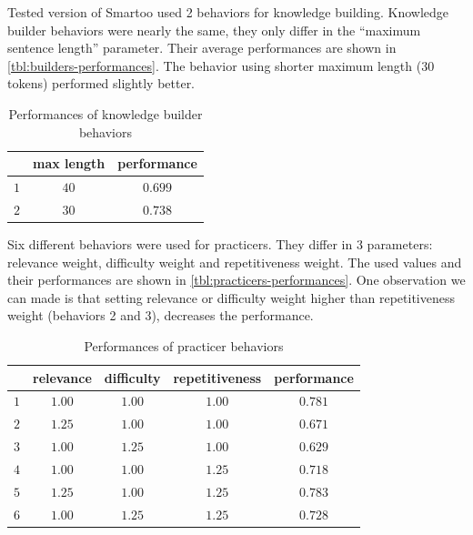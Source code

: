 \documentclass[12pt, twoside]{fithesis2}
\renewcommand{\_}{\leavevmode \kern0.07em\vbox{\hrule width0.4em}}
\begin{document}
Tested version of Smartoo used 2 behaviors for knowledge building.
Knowledge builder behaviors were nearly the same, they only differ in the ``maximum sentence length'' parameter.
Their average performances are shown in \autoref{tbl:builders-performances}.
The behavior using shorter maximum length (30 tokens) performed slightly better.

\begin{table}[h]
\begin{center}
\begin{tabular}{| c | c | c |}
  \hline
      & max length & performance\\
  \hline
  $1$ & $40$ & $0.699$\\
  $2$ & $30$ & $0.738$\\
  \hline
\end{tabular}
\end{center}
\caption{Performances of knowledge builder behaviors}
\label{tbl:builders-performances}
\end{table}

Six different behaviors were used for practicers.
They differ in 3 parameters: relevance weight, difficulty weight and repetitiveness weight.
The used values and their performances are shown in \autoref{tbl:practicers-performances}.
One observation we can made is that setting relevance or difficulty weight higher than repetitiveness weight (behaviors 2 and 3), decreases the performance.

\begin{table}[h]
\begin{center}
\begin{tabular}{| c | c  c  c | c |}
  \hline
      & relevance & difficulty & repetitiveness & performance\\
  \hline
  $1$ & $1.00$ & $1.00$ & $1.00$ & $0.781$\\
  $2$ & $1.25$ & $1.00$ & $1.00$ & $0.671$\\
  $3$ & $1.00$ & $1.25$ & $1.00$ & $0.629$\\
  $4$ & $1.00$ & $1.00$ & $1.25$ & $0.718$\\
  $5$ & $1.25$ & $1.00$ & $1.25$ & $0.783$\\
  $6$ & $1.00$ & $1.25$ & $1.25$ & $0.728$\\
  \hline
\end{tabular}
\end{center}
\caption{Performances of practicer behaviors}
\label{tbl:practicers-performances}
\end{table}
\end{document}
